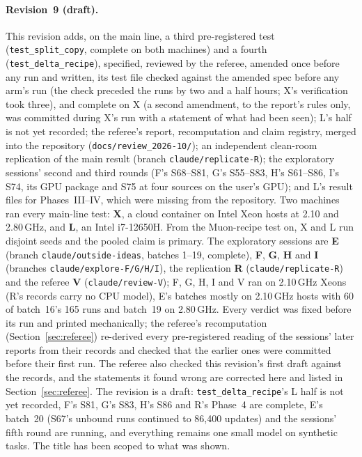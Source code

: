 \documentclass[11pt]{article}
\begin{document}
\paragraph{Revision~9 (draft).}\sloppy This revision adds, on the main line, a third pre-registered test (\texttt{test\_split\_copy}, complete on both machines) and a fourth (\texttt{test\_delta\_recipe}), specified, reviewed by the referee, amended once before any run and written, its test file checked against the amended spec before any arm's run (the check preceded the runs by two and a half hours; X's verification took three), and complete on X (a second amendment, to the report's rules only, was committed during X's run with a statement of what had been seen); L's half is not yet recorded; the referee's report, recomputation and claim registry, merged into the repository (\texttt{docs/review\_2026-10/}); an independent clean-room replication of the main result (branch \texttt{claude/replicate-R}); the exploratory sessions' second and third rounds (F's S68--S81, G's S55--S83, H's S61--S86, I's S74, its GPU package and S75 at four sources on the user's GPU); and L's result files for Phases~III--IV, which were missing from the repository. Two machines ran every main-line test: \textbf{X}, a cloud container on Intel Xeon hosts at 2.10 and 2.80\,GHz, and \textbf{L}, an Intel i7-12650H. From the Muon-recipe test on, X and L run disjoint seeds and the pooled claim is primary. The exploratory sessions are \textbf{E} (branch \texttt{claude/outside-ideas}, batches 1--19, complete), \textbf{F}, \textbf{G}, \textbf{H} and \textbf{I} (branches \texttt{claude/explore-F/G/H/I}), the replication \textbf{R} (\texttt{claude/replicate-R}) and the referee \textbf{V} (\texttt{claude/review-V}); F, G, H, I and V ran on 2.10\,GHz Xeons (R's records carry no CPU model), E's batches mostly on 2.10\,GHz hosts with 60 of batch~16's 165 runs and batch~19 on 2.80\,GHz. Every verdict was fixed before its run and printed mechanically; the referee's recomputation (Section~\ref{sec:referee}) re-derived every pre-registered reading of the sessions' later reports from their records and checked that the earlier ones were committed before their first run. The referee also checked this revision's first draft against the records, and the statements it found wrong are corrected here and listed in Section~\ref{sec:referee}. The revision is a draft: \texttt{test\_delta\_recipe}'s L half is not yet recorded, F's S81, G's S83, H's S86 and R's Phase~4 are complete, E's batch~20 (S67's unbound runs continued to 86{,}400 updates) and the sessions' fifth round are running, and everything remains one small model on synthetic tasks. The title has been scoped to what was shown.
\end{document}

